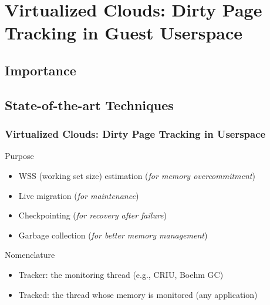 \documentclass[xcolor=table,bigger,unknownkeysallowed]{beamer}
\begin{document}
\section{Virtualized Clouds: Dirty Page Tracking in Guest Userspace}
\subsection{Importance}
\subsection{State-of-the-art Techniques}
\begin{frame}
\frametitle{Virtualized Clouds: Dirty Page Tracking in Userspace} 
	\begin{block}{Purpose}
		\begin{itemize}
			\item WSS (working set size) estimation (\textit{for memory overcommitment})
			\item Live migration (\textit{for maintenance})
			\item Checkpointing (\textit{for recovery after failure})
			\item Garbage collection (\textit{for better memory management})
		\end{itemize}
	\end{block}	
		
	\pause

	\begin{block}{Nomenclature}
		\begin{itemize}
			\item Tracker: the monitoring thread (e.g., CRIU, Boehm GC)
			\item Tracked: the thread whose memory is monitored (any application)
		\end{itemize}
	\end{block}	
\end{frame}
\end{document}
